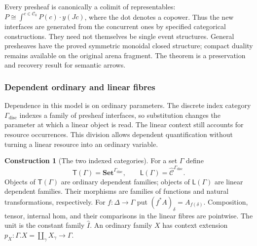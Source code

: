 \documentclass[11pt,a4paper]{article}
\numberwithin{equation}{section}
\theoremstyle{definition}
\newtheorem{construction}[construction]{Construction}
\theoremstyle{remark}
\theoremstyle{plain}
\begin{document}
Every presheaf is canonically a colimit of representables:
$P\cong\int^{c\in\mathcal C_0}P(c)\cdot y(Jc)$, where the dot denotes a copower. Thus the
new interfaces are generated from the concurrent ones by specified
categorical constructions. They need not themselves be single event
structures. General presheaves have the proved symmetric monoidal closed
structure; compact duality remains available on the original arena
fragment. The theorem is a preservation and recovery result for semantic
arrows.

\subsubsection{Dependent ordinary and linear fibres}

Dependence in this model is on ordinary parameters. The discrete index category $\Gamma_{\mathrm{disc}}$
indexes a family of presheaf interfaces, so substitution changes the
parameter at which a linear object is read. The linear context still
accounts for resource occurrences. This division allows dependent
quantification without turning a linear resource into an ordinary
variable.

\begin{construction}[The two indexed categories]
\label{con:egt-dependent-fibres}
For a set $\Gamma$ define
\[
 \mathsf T(\Gamma)=\mathbf{Set}^{\Gamma_{\mathrm{disc}}},
 \qquad
 \mathsf L(\Gamma)=\widehat{\mathcal C}^{\Gamma_{\mathrm{disc}}}.
\]
Objects of $\mathsf T(\Gamma)$ are ordinary dependent families; objects
of $\mathsf L(\Gamma)$ are linear dependent families. Their morphisms
are families of functions and natural transformations, respectively.
For $f:\Delta\to\Gamma$ put $(f^*A)_\delta=A_{f(\delta)}$.
Composition, tensor, internal hom, and their comparisons in the linear
fibres are pointwise. The unit is the constant family $\widehat I$.
An ordinary family $X$ has context extension
$p_X:\Gamma.X=\coprod_\gamma X_\gamma\to\Gamma$.
\end{construction}
\end{document}
